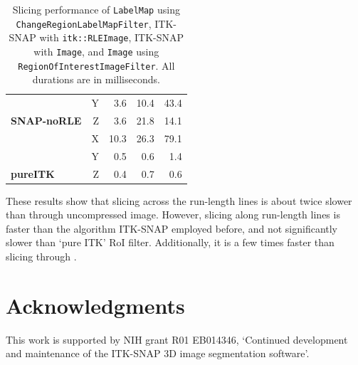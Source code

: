 \documentclass{InsightArticle}
\begin{document}
\begin{table}[h]
\begin{tabular}{lrrrr}
		{\color[HTML]{9A0000} }                                      & {\color[HTML]{9A0000} Y} & {\color[HTML]{9A0000} 3.6}  & {\color[HTML]{9A0000} 10.4} & {\color[HTML]{9A0000} 43.4}  \\
		\multirow{-3}{*}{{\color[HTML]{9A0000} \textbf{SNAP-noRLE}}} & {\color[HTML]{9A0000} Z} & {\color[HTML]{9A0000} 3.6}  & {\color[HTML]{9A0000} 21.8} & {\color[HTML]{9A0000} 14.1}  \\
																																& X                        & 10.3                        & 26.3                        & 79.1                         \\
																																& Y                        & 0.5                         & 0.6                         & 1.4                          \\
		\multirow{-3}{*}{\textbf{pureITK}}                           & Z                        & 0.4                         & 0.7                         & 0.6                         
		\end{tabular}
	\caption{Slicing performance of \texttt{LabelMap} using \texttt{ChangeRegionLabelMapFilter},
	ITK-SNAP with \texttt{itk::RLEImage}, ITK-SNAP with \texttt{Image},
	and \texttt{Image} using \texttt{RegionOfInterestImageFilter}. All durations are in milliseconds.}
	\label{tab:slicingPerformance}
\end{table}

These results show that slicing across the run-length lines is about
twice slower than through uncompressed image.
However, slicing along run-length lines is faster than the algorithm
ITK-SNAP employed before, and not significantly slower than  `pure ITK' RoI filter.
Additionally, it is a few times faster than slicing through .

\section{Acknowledgments}

This work is supported by NIH grant R01 EB014346,
`Continued development and maintenance of the ITK-SNAP 3D image segmentation software'.



\end{document}
